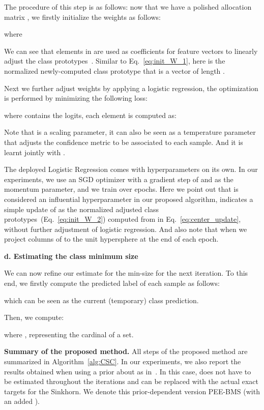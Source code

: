 \documentclass[review]{elsarticle}
\begin{document}
The procedure of this step is as follows: now that we have a polished allocation matrix , we firstly initialize the weights  as follows:

where 

We can see that elements in  are used as coefficients for feature vectors to linearly adjust the class prototypes~\cite{hu2021leveraging}. Similar to Eq.~\ref{eq:init_W_1}, here  is the normalized newly-computed class prototype that is a vector of length . 

Next we further adjust weights by applying a logistic regression, the optimization is performed by minimizing the following loss:

where  contains the logits, each element is computed as:

Note that  is a scaling parameter, it can also be seen as a temperature parameter that adjusts the confidence metric to be associated to each sample. And it is learnt jointly with .

The deployed Logistic Regression comes with hyperparameters on its own. In our experiments, we use an SGD optimizer with a gradient step of  and  as the momentum parameter, and we train over  epochs. Here we point out that  is considered an influential hyperparameter in our proposed algorithm,  indicates a simple update of  as the normalized adjusted class prototypes~(Eq.~\ref{eq:init_W_2}) computed from  in Eq.~\ref{eq:center_update}, without further adjustment of logistic regression. And also note that when  we project columns of  to the unit hypersphere at the end of each epoch. 

\textbf{d. Estimating the class minimum size}

We can now refine our estimate for the min-size  for the next iteration. To this end, we firstly compute the predicted label of each sample as follows: 
 
which can be seen as the current (temporary) class prediction.

Then, we compute:
 
where ,  representing the cardinal of a set.

\textbf{Summary of the proposed method.} All steps of the proposed method are summarized in Algorithm~\ref{alg:CSC}. In our experiments, we also report the results obtained when using a prior about  as in~\cite{hu2021leveraging}. In this case,  does not have to be estimated throughout the iterations and can be replaced with the actual exact targets for the Sinkhorn. We denote this prior-dependent version PEE-BMS (with an added ).
\end{document}
